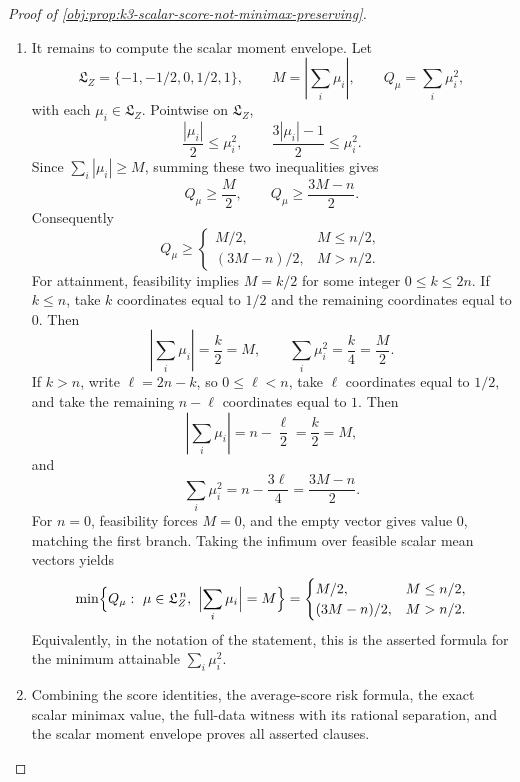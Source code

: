 \begin{proof}[Proof of \cref{obj:prop:k3-scalar-score-not-minimax-preserving}]
\begin{enumerate}
\item
It remains to compute the scalar moment envelope. Let
\[
\mathfrak L_Z=\{-1,-1/2,0,1/2,1\},
\qquad
M=\left|\sum_i\mu_i\right|,
\qquad
Q_\mu=\sum_i\mu_i^2,
\]
with each \(\mu_i\in\mathfrak L_Z\). Pointwise on \(\mathfrak L_Z\),
\[
\frac{|\mu_i|}{2}\le \mu_i^2,
\qquad
\frac{3|\mu_i|-1}{2}\le \mu_i^2 .
\]
Since \(\sum_i|\mu_i|\ge M\), summing these two inequalities gives
\[
Q_\mu\ge \frac M2,
\qquad
Q_\mu\ge \frac{3M-n}{2}.
\]
Consequently
\[
Q_\mu\ge
\begin{cases}
M/2, & M\le n/2,\\
(3M-n)/2, & M>n/2.
\end{cases}
\]
For attainment, feasibility implies \(M=k/2\) for some integer \(0\le k\le2n\). If \(k\le n\), take \(k\) coordinates equal to \(1/2\) and the remaining coordinates equal to \(0\). Then
\[
\left|\sum_i\mu_i\right|=\frac k2=M,
\qquad
\sum_i\mu_i^2=\frac k4=\frac M2 .
\]
If \(k>n\), write \(\ell=2n-k\), so \(0\le\ell<n\), take \(\ell\) coordinates equal to \(1/2\), and take the remaining \(n-\ell\) coordinates equal to \(1\). Then
\[
\left|\sum_i\mu_i\right|
=n-\frac{\ell}{2}
=\frac k2=M,
\]
and
\[
\sum_i\mu_i^2
=n-\frac{3\ell}{4}
=\frac{3M-n}{2}.
\]
For \(n=0\), feasibility forces \(M=0\), and the empty vector gives value \(0\), matching the first branch. Taking the infimum over feasible scalar mean vectors yields
\[
\min\Bigl\{Q_\mu:\ \mu\in\mathfrak L_Z^{\,n},\ \Bigl|\sum_i\mu_i\Bigr|=M\Bigr\}
=
\begin{cases}
M/2, & M\le n/2,\\
(3M-n)/2, & M>n/2.
\end{cases}
\]
Equivalently, in the notation of the statement, this is the asserted formula for the minimum attainable \(\sum_i\mu_i^2\). %

\item
Combining the score identities, the average-score risk formula, the exact scalar minimax value, the full-data witness with its rational separation, and the scalar moment envelope proves all asserted clauses. %
\end{enumerate}
\end{proof}

